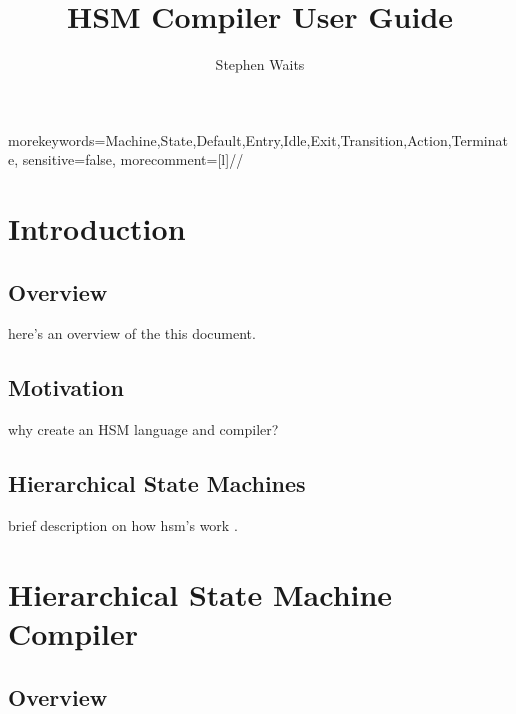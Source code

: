\documentclass[titlepage,letterpaper]{report}
\title{HSM Compiler User Guide}
\author{Stephen Waits}
\begin{document}
%
  {morekeywords={Machine,State,Default,Entry,Idle,Exit,Transition,Action,Terminate},
   sensitive=false,
   morecomment=[l]{//}
  }


\maketitle


\tableofcontents

\newpage

\lstlistoflistings

\newpage





\chapter{Introduction}

\section{Overview}

here's an overview of the this document.

\section{Motivation}

why create an HSM language and compiler?

\section{Hierarchical State Machines}

brief description on how hsm's work \cite{harel:sta}.



\chapter{Hierarchical State Machine Compiler}

\section{Overview}
\end{document}
